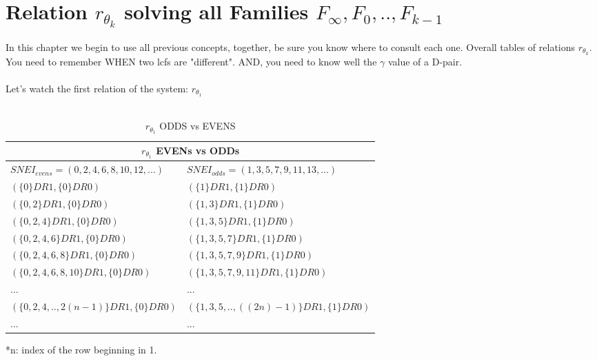 \chapter{Relation $r_{\theta_{k}}$ solving all Families $F_{\infty}, F_{0}, .. , F_{k-1}$}

	\noindent
	In this chapter we begin to use all previous concepts, together, be sure you know where to consult each one. Overall tables of relations $r_{\theta_{k}}$. You need to remember WHEN two lcfs are "different". AND, you need to know well the $\gamma$ value of a D-pair.
	\\\\
	
	\noindent
	Let's watch the first relation of the system: $r_{\theta_{1}}$
	\\\\
	
	\begin{table}[h!]
		\begin{center}
			\begin{tabular}{|l||l|}
				\hline
				\multicolumn{2}{|c|}{\cellcolor{lightgray} {$r_{\theta_{1}}$ EVENs vs ODDs } } \\
				\hline
				$SNEI_{evens} = (0,2,4,6,8,10,12,...)$ & $ SNEI_{odds} = (1,3,5,7,9,11,13,...)$   \\
				\hline
				\hline
				$ ( \{0\}DR1, \{0\}DR0 ) $ & $ ( \{1\}DR1, \{1\}DR0 ) $ \\
				\hline
				$ ( \{0,2\}DR1, \{0\}DR0 ) $ & $ ( \{1,3\}DR1, \{1\}DR0 ) $ \\
				\hline
				$ ( \{0,2,4\}DR1, \{0\}DR0 ) $ & $ ( \{1,3,5\}DR1, \{1\}DR0 ) $ \\
				\hline
				$ ( \{0,2,4,6\}DR1, \{0\}DR0 ) $ & $ ( \{1,3,5,7\}DR1, \{1\}DR0 ) $ \\
				\hline
				$ ( \{0,2,4,6,8\}DR1, \{0\}DR0 ) $ & $ ( \{1,3,5,7,9\}DR1, \{1\}DR0 ) $ \\
				\hline
				$ ( \{0,2,4,6,8,10\}DR1, \{0\}DR0 ) $ & $ ( \{1,3,5,7,9,11\}DR1, \{1\}DR0 ) $ \\
				\hline
				... & ... \\
				\hline
				$ (\{0,2,4,.., 2(n-1)\}DR1, \{0\}DR0 )$ & $ (\{1,3,5,.., ((2n)-1) \}DR1, \{1\}DR0 )$ \\
				\hline
				... & ... \\
				\hline
				
			\end{tabular}
			\caption{$r_{\theta_{1}}$  ODDS vs EVENS}
			\label{tab: r_theta_1_odds_vs_evens}
		\end{center}
	\end{table}
	\noindent
	*n: index of the row beginning in 1.
	\\\\
	
